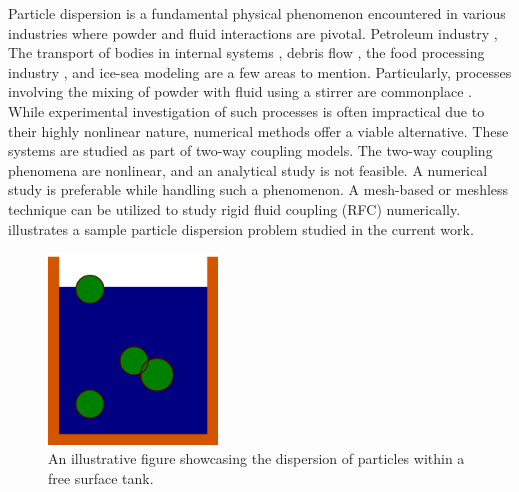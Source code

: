 \documentclass[preprint,12pt]{elsarticle}
\begin{document}
Particle dispersion is a fundamental physical phenomenon encountered in
various industries where powder and fluid interactions are pivotal.  Petroleum
industry \cite{wang2023developments}, The transport of bodies in internal
systems \cite{Dai2021}, debris flow \cite{Qingyun2022}, the food processing
industry \cite{Karunasena2014}, and ice-sea modeling \cite{Mintu2018} are a
few areas to mention.  Particularly, processes involving the mixing of powder
with fluid using a stirrer are commonplace \cite{li2022study}. While
experimental investigation of such processes is often impractical due to their
highly nonlinear nature, numerical methods offer a viable alternative. These
systems are studied as part of two-way coupling models. The two-way coupling
phenomena are nonlinear, and an analytical study is not feasible. A numerical
study is preferable while handling such a phenomenon. A mesh-based or meshless
technique can be utilized to study rigid fluid coupling (RFC) numerically.
 illustrates a sample particle dispersion
problem studied in the current work.
\begin{figure}[!htpb]
  \centering
  \includegraphics[width=0.4\textwidth]{images/hs_tank_fluid_with_particles}
  \caption{An illustrative figure showcasing the dispersion of particles within a free surface tank.}
  \label{intro:schematic}
\end{figure}
\end{document}
